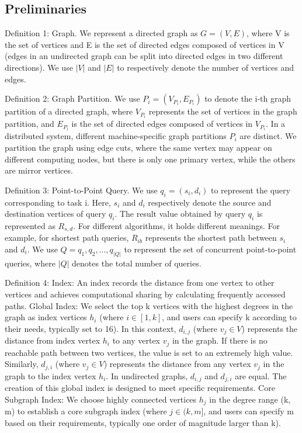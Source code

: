 \documentclass[lettersize,journal]{IEEEtran} %
\begin{document}
\subsection{Preliminaries}
Definition 1: Graph. We represent a directed graph as $G=(V,E)$, where V is the set of vertices and E is the set of directed edges composed of vertices in V (edges in an undirected graph can be split into directed edges in two different directions). We use $|V|$ and $|E|$ to respectively denote the number of vertices and edges.

Definition 2: Graph Partition. We use $P_i=(V_{P_i},E_{P_i})$ to denote the i-th graph partition of a directed graph, where $V_{P_i}$ represents the set of vertices in the graph partition, and $E_{P_i}$ is the set of directed edges composed of vertices in $V_{P_i}$. In a distributed system, different machine-specific graph partitions $P_i$ are distinct. We partition the graph using edge cuts, where the same vertex may appear on different computing nodes, but there is only one primary vertex, while the others are mirror vertices.

Definition 3: Point-to-Point Query. We use $q_i=(s_i,d_i)$ to represent the query corresponding to task i. Here, $s_i$ and $d_i$ respectively denote the source and destination vertices of query $q_i$. The result value obtained by query $q_i$ is represented as $R_{s,d}$. For different algorithms, it holds different meanings. For example, for shortest path queries, $R_{ib}$ represents the shortest path between $s_i$ and $d_i$. We use $Q={q_1,q_2,\ldots,q_{|Q|}}$ to represent the set of concurrent point-to-point queries, where $|Q|$ denotes the total number of queries.

Definition 4: Index: An index records the distance from one vertex to other vertices and achieves computational sharing by calculating frequently accessed paths. Global Index: We select the top k vertices with the highest degrees in the graph as index vertices $h_i$ (where $i\in [1, k]$, and users can specify k according to their needs, typically set to 16). In this context, $d_{i,j}$ (where $v_j\in V$) represents the distance from index vertex $h_i$ to any vertex $v_j$ in the graph. If there is no reachable path between two vertices, the value is set to an extremely high value. Similarly, $d_{j,i}$ (where $v_j\in V$) represents the distance from any vertex $v_j$ in the graph to the index vertex $h_i$. In undirected graphs, $d_{i,j}$ and $d_{j,i}$ are equal. The creation of this global index is designed to meet specific requirements. Core Subgraph Index: We choose highly connected vertices $h_j$ in the degree range (k, m) to establish a core subgraph index (where $j\in (k, m]$, and users can specify m based on their requirements, typically one order of magnitude larger than k).
\end{document}
